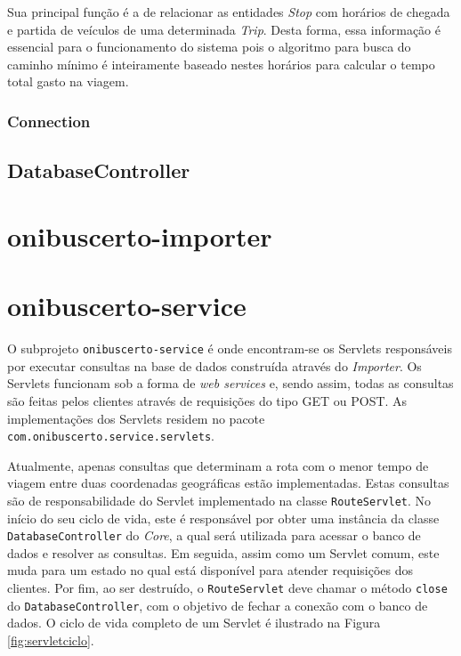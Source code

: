 Sua principal função é a de relacionar as entidades \emph{Stop} com horários de chegada e partida de veículos de uma determinada \emph{Trip}.
Desta forma, essa informação é essencial para o funcionamento do sistema pois o algoritmo para busca do caminho mínimo é inteiramente baseado nestes horários para calcular o tempo total gasto na viagem.

\subsubsection{Connection}
\label{conn}

\subsection{DatabaseController}


\section{onibuscerto-importer}

\section{onibuscerto-service}

O subprojeto \texttt{onibuscerto-service} é onde encontram-se os Servlets responsáveis por executar consultas na base de dados construída através do \emph{Importer}.
Os Servlets funcionam sob a forma de \emph{web services} e, sendo assim, todas as consultas são feitas pelos clientes através de requisições  do tipo GET ou POST.
As implementações dos Servlets residem no pacote \texttt{com.onibuscerto.service.servlets}.

Atualmente, apenas consultas que determinam a rota com o menor tempo de viagem entre duas coordenadas geográficas estão implementadas.
Estas consultas são de responsabilidade do Servlet implementado na classe \texttt{RouteServlet}.
No início do seu ciclo de vida, este é responsável por obter uma instância da classe \texttt{DatabaseController} do \emph{Core}, a qual será utilizada para acessar o banco de dados e resolver as consultas.
Em seguida, assim como um Servlet comum, este muda para um estado no qual está disponível para atender requisições dos clientes.
Por fim, ao ser destruído, o \texttt{RouteServlet} deve chamar o método \texttt{close} do \texttt{DatabaseController}, com o objetivo de fechar a conexão com o banco de dados.
O ciclo de vida completo de um Servlet é ilustrado na Figura \ref{fig:servletciclo}.


